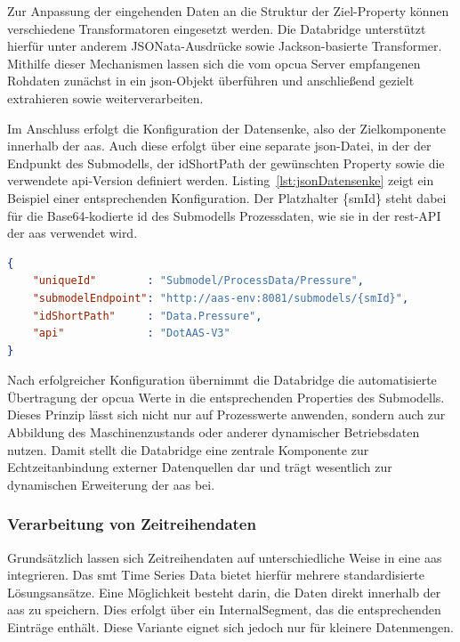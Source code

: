 Zur Anpassung der eingehenden Daten an die Struktur der Ziel-Property können verschiedene Transformatoren eingesetzt werden.
Die Databridge unterstützt hierfür unter anderem JSONata-Ausdrücke sowie Jackson-basierte Transformer.
Mithilfe dieser Mechanismen lassen sich die vom \acs{opcua} Server empfangenen Rohdaten zunächst in ein \acs{json}-Objekt überführen und anschließend gezielt extrahieren sowie weiterverarbeiten.

Im Anschluss erfolgt die Konfiguration der Datensenke, also der Zielkomponente innerhalb der \acs{aas}.
Auch diese erfolgt über eine separate \acs{json}-Datei, in der der Endpunkt des Submodells, der idShortPath der gewünschten Property sowie die verwendete \acs{api}-Version definiert werden.
Listing~\ref{lst:jsonDatensenke} zeigt ein Beispiel einer entsprechenden Konfiguration.
Der Platzhalter \{smId\} steht dabei für die Base64-kodierte \acs{id} des Submodells Prozessdaten, wie sie in der \acs{rest}-API der \acs{aas} verwendet wird.

\newpage
\begin{lstlisting}[language=json, caption={\acs{json}-Konfiguration einer Datensenke}, label={lst:jsonDatensenke}]
{
    "uniqueId"        : "Submodel/ProcessData/Pressure",
    "submodelEndpoint": "http://aas-env:8081/submodels/{smId}",
    "idShortPath"     : "Data.Pressure",
    "api"             : "DotAAS-V3"
}
\end{lstlisting}

Nach erfolgreicher Konfiguration übernimmt die Databridge die automatisierte Übertragung der \acs{opcua} Werte in die entsprechenden Properties des Submodells.
Dieses Prinzip lässt sich nicht nur auf Prozesswerte anwenden, sondern auch zur Abbildung des Maschinenzustands oder anderer dynamischer Betriebsdaten nutzen.
Damit stellt die Databridge eine zentrale Komponente zur Echtzeitanbindung externer Datenquellen dar und trägt wesentlich zur dynamischen Erweiterung der \acs{aas} bei.

\subsubsection{Verarbeitung von Zeitreihendaten}
\label{sec: VerarbeitungZeitreihen}
Grundsätzlich lassen sich Zeitreihendaten auf unterschiedliche Weise in eine \acs{aas} integrieren.
Das \acs{smt} Time Series Data \cite{SpezifikationTimeSeriesData} bietet hierfür mehrere standardisierte Lösungsansätze.
Eine Möglichkeit besteht darin, die Daten direkt innerhalb der \acs{aas} zu speichern. 
Dies erfolgt über ein InternalSegment, das die entsprechenden Einträge enthält.
Diese Variante eignet sich jedoch nur für kleinere Datenmengen.

